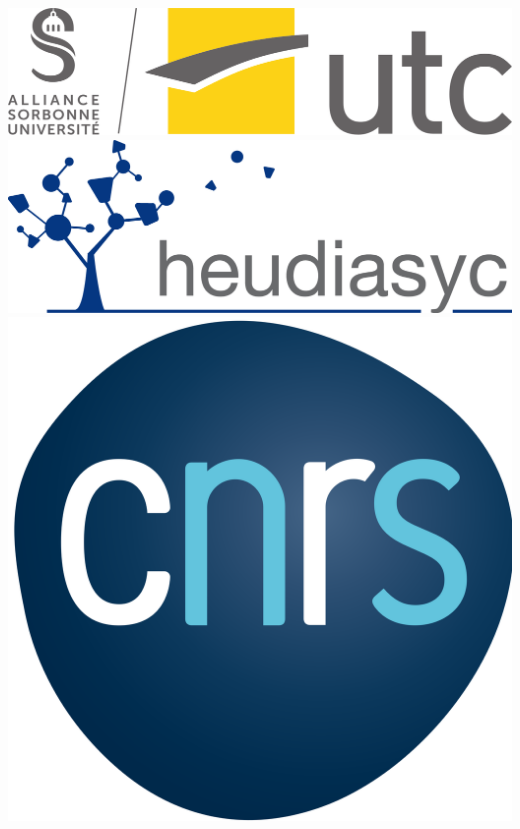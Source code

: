\begin{titlingpage}
\begin{center}
        
        \vspace{1cm}\hfill
        \includegraphics[height=0.06\textheight]{prefrontmatter/utc.png}\hfill
        \includegraphics[height=0.06\textheight]{prefrontmatter/Logo_Heudiasyc.png}\hfill
        \includegraphics[height=0.06\textheight]{prefrontmatter/cnrs.png}\hfill
    \end{center}
\end{titlingpage}


